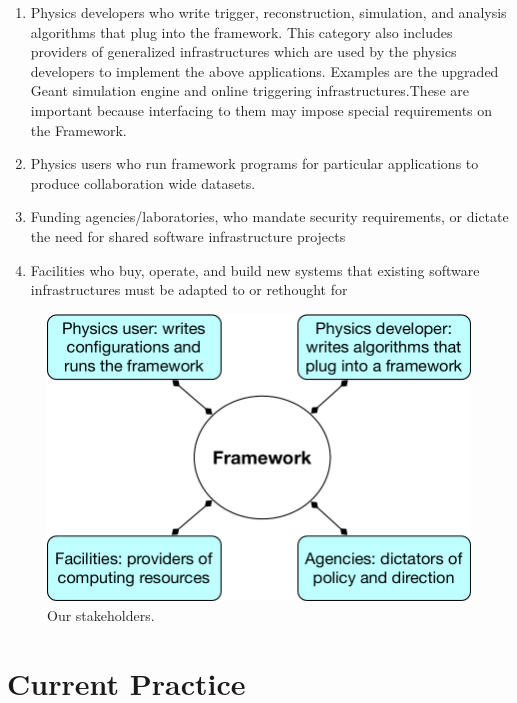 \documentclass[12pt,a4paper]{article}
\begin{document}
\begin{enumerate}
\item
    Physics developers who write trigger, reconstruction, simulation,
    and analysis algorithms that plug into the framework. This
    category also includes providers of generalized infrastructures
    which are used by the physics developers to implement the above
    applications. Examples are the upgraded Geant simulation engine
    and online triggering infrastructures.These are important because
    interfacing to them may impose special requirements on the
    Framework.
\item
    Physics users who run framework programs for particular
    applications to produce collaboration wide datasets.
\item
    Funding agencies/laboratories, who mandate security requirements,
    or dictate the need for shared software infrastructure projects
\item
    Facilities who buy, operate, and build new systems that existing
    software infrastructures must be adapted to or rethought for
\end{enumerate}

\begin{figure}[hbt] %
\centering
\includegraphics[width=.75\textwidth]{stakeholders.pdf}
\caption{Our stakeholders. \label{fig:stakeholders}}
\end{figure}


\section{Current Practice}
\label{sec:current-practice}
\end{document}
